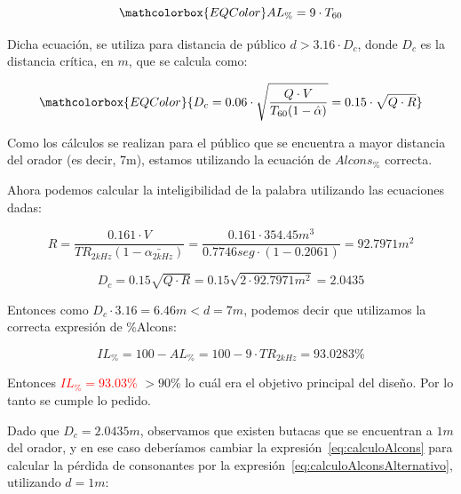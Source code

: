 \begin{equation}
    \mathcolorbox{EQColor}{ AL_{\%} = 9 \cdot T_{60} }
    \label{eq:calculoAlcons}
\end{equation}

\par Dicha ecuación, se utiliza para distancia de público $d>3.16\cdot D_c$, donde $D_c$ es la distancia crítica, en $m$, que se calcula como:

\begin{equation}
   \mathcolorbox{EQColor}{ D_c = 0.06 \cdot \sqrt{\frac{Q \cdot V}{T_{60} (1- \hat{\alpha})}} = 0.15 \cdot \sqrt{Q\cdot R} }
\end{equation}

\par Como los cálculos se realizan para el público que se encuentra a mayor distancia del orador (es decir, 7m), estamos utilizando la ecuación de $Alcons_{\%}$ correcta.\\

\par Ahora podemos calcular la inteligibilidad de la palabra utilizando las ecuaciones dadas:

\begin{equation*}
        R  = \frac{0.161 \cdot V}{TR_{2kHz} (1- \bar{\alpha_{2kHz}})} =  \frac{0.161 \cdot 354.45 m^3}{0.7746 seg \cdot (1- 0.2061)} =92.7971 m^2
\end{equation*}

\begin{equation*}
        D_c = 0.15 \sqrt{Q\cdot R} = 0.15 \sqrt{ 2\cdot 92.7971 m^2} =  2.0435
\end{equation*}

\par Entonces como $D_c \cdot3.16 = 6.46m < d = 7m$, podemos decir que utilizamos la correcta expresión de \%Alcons:

\begin{equation*}
   \boxed{ IL_{\%} = 100 - AL_{\%} = 100 - 9\cdot TR_{2kHz} =  93.0283\% }
\end{equation*}

\par Entonces \textcolor{red}{ $IL_{\%} = 93.03\%$ } $> 90\% $ lo cuál era el objetivo principal del diseño. Por lo tanto se cumple lo pedido.\\

\par Dado que $D_c = 2.0435m$, observamos que existen butacas que se encuentran a $1m$ del orador, y en ese caso deberíamos cambiar la expresión~\eqref{eq:calculoAlcons} para calcular la pérdida de consonantes por la expresión~\eqref{eq:calculoAlconsAlternativo}, utilizando $d=1m$:

